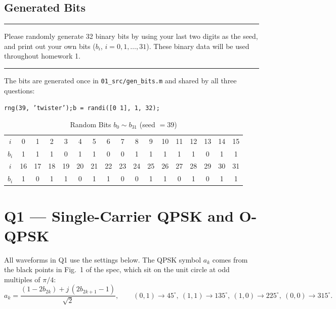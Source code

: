 \documentclass[12pt,a4paper]{report}
\newcommand{\question}[1]{%
    \hrule
    \vspace{0.2cm}
    #1
    \vspace{0.2cm}
    \hrule
    \vspace{0.5cm}
}
\begin{document}
\section{Generated Bits}

\question{Please randomly generate 32 binary bits by using your last two digits as the seed, and
print out your own bits ($b_i$, $i = 0, 1, \ldots, 31$). These binary data will be used throughout
homework 1.}

The bits are generated once in \texttt{01\_src/gen\_bits.m} and shared by all three questions:

\begin{center}
\texttt{rng(39, 'twister');\quad b = randi([0 1], 1, 32);}
\end{center}

\begin{table}[H]
\centering
\caption{Random Bits $b_0 \sim b_{31}$ (seed $= 39$)}
\setlength{\tabcolsep}{5pt}
\renewcommand{\arraystretch}{1.2}
\begin{tabular}{c*{16}{c}}
\toprule
$i$   & 0 & 1 & 2 & 3 & 4 & 5 & 6 & 7 & 8 & 9 & 10 & 11 & 12 & 13 & 14 & 15 \\
$b_i$ & 1 & 1 & 1 & 0 & 1 & 1 & 0 & 0 & 1 & 1 & 1  & 1  & 1  & 0  & 1  & 1  \\
\midrule
$i$   & 16 & 17 & 18 & 19 & 20 & 21 & 22 & 23 & 24 & 25 & 26 & 27 & 28 & 29 & 30 & 31 \\
$b_i$ & 1  & 0  & 1  & 1  & 0  & 1  & 1  & 0  & 0  & 1  & 1  & 0  & 1  & 0  & 1  & 1  \\
\bottomrule
\end{tabular}
\end{table}

\newpage

\chapter{Q1 — Single-Carrier QPSK and O-QPSK}
All waveforms in Q1 use the settings below. The QPSK symbol $a_k$ comes from the black points
in Fig.~1 of the spec, which sit on the unit circle at odd multiples of $\pi/4$:
\begin{equation}
    a_k = \frac{(1 - 2b_{2k}) + j\,(2b_{2k+1} - 1)}{\sqrt{2}},
    \qquad (0,1) \to 45^\circ,\ (1,1) \to 135^\circ,\ (1,0) \to 225^\circ,\ (0,0) \to 315^\circ .
\end{equation}
\end{document}
